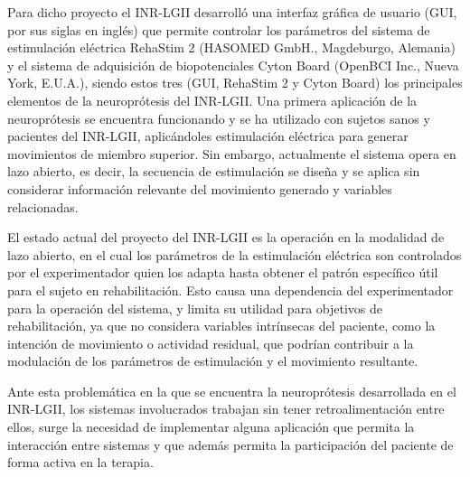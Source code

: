 Para dicho proyecto el INR-LGII desarrolló una interfaz gráfica de usuario (GUI, por sus siglas en inglés) que permite controlar los parámetros del sistema de estimulación eléctrica RehaStim 2 (HASOMED GmbH., Magdeburgo, Alemania) y el sistema de adquisición de biopotenciales Cyton Board (OpenBCI Inc., Nueva York, E.U.A.), siendo estos tres (GUI, RehaStim 2 y Cyton Board) los principales elementos de la neuroprótesis del INR-LGII. Una primera aplicación de la neuroprótesis se encuentra funcionando y se ha utilizado con sujetos sanos y pacientes del INR-LGII, aplicándoles estimulación eléctrica para generar movimientos de miembro superior. Sin embargo, actualmente el sistema opera en lazo abierto, es decir, la secuencia de estimulación se diseña y se aplica sin considerar información relevante del movimiento generado y variables relacionadas.

El estado actual del proyecto del INR-LGII es la  operación en la modalidad de lazo abierto, en el cual los parámetros de la estimulación eléctrica son controlados por el experimentador quien los adapta hasta obtener el patrón específico útil para el sujeto en rehabilitación. Esto causa una dependencia del experimentador para la operación del sistema, y limita su utilidad para objetivos de rehabilitación, ya que no considera variables intrínsecas del paciente, como la intención de movimiento o actividad residual, que podrían contribuir a la modulación de los parámetros de estimulación y el movimiento resultante.



Ante esta problemática en la que se encuentra la neuroprótesis desarrollada en el INR-LGII, los sistemas involucrados trabajan sin tener retroalimentación entre ellos, surge la necesidad de implementar alguna aplicación que permita la interacción entre sistemas y que además permita la participación del paciente de forma activa en la terapia.

